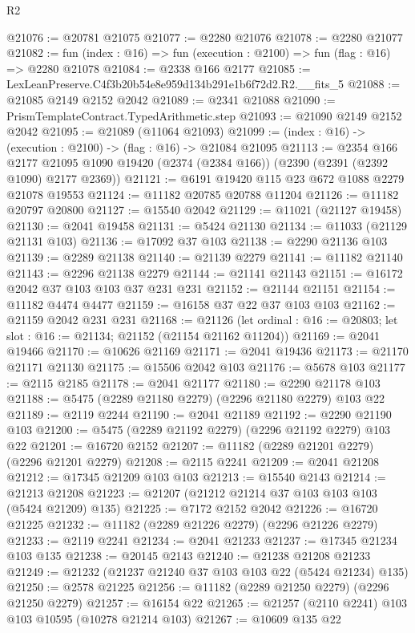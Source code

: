 \begin{lexlean}{R2}
\begin{coremodule}
@21076 := @20781 @21075
@21077 := @2280 @21076
@21078 := @2280 @21077
@21082 := fun (index : @16) => fun (execution : @2100) => fun (flag : @16) => @2280 @21078
@21084 := @2338 @166 @2177
@21085 := LexLeanPreserve.C4f3b20b54e8e959d134b291e1b6f72d2.R2.__fits_5
@21088 := @21085 @2149 @2152 @2042
@21089 := @2341 @21088
@21090 := PrismTemplateContract.TypedArithmetic.step
@21093 := @21090 @2149 @2152 @2042
@21095 := @21089 (@11064 @21093)
@21099 := (index : @16) -> (execution : @2100) -> (flag : @16) -> @21084 @21095
@21113 := @2354
    @166
    @2177
    @21095
    @1090
    @19420
    (@2374 (@2384 @166))
    (@2390 (@2391 (@2392 @1090) @2177 @2369))
@21121 := @6191 @19420 @115 @23 @672 @1088 @2279 @21078 @19553
@21124 := @11182 @20785 @20788 @11204
@21126 := @11182 @20797 @20800
@21127 := @15540 @2042
@21129 := @11021 (@21127 @19458)
@21130 := @2041 @19458
@21131 := @5424 @21130
@21134 := @11033 (@21129 @21131 @103)
@21136 := @17092 @37 @103
@21138 := @2290 @21136 @103
@21139 := @2289 @21138
@21140 := @21139 @2279
@21141 := @11182 @21140
@21143 := @2296 @21138 @2279
@21144 := @21141 @21143
@21151 := @16172 @2042 @37 @103 @103 @37 @231 @231
@21152 := @21144 @21151
@21154 := @11182 @4474 @4477
@21159 := @16158 @37 @22 @37 @103 @103
@21162 := @21159 @2042 @231 @231
@21168 := @21126
    (let ordinal : @16 := @20803; let slot : @16 := @21134; @21152 (@21154 @21162 @11204))
@21169 := @2041 @19466
@21170 := @10626 @21169
@21171 := @2041 @19436
@21173 := @21170 @21171 @21130
@21175 := @15506 @2042 @103
@21176 := @5678 @103
@21177 := @2115 @2185
@21178 := @2041 @21177
@21180 := @2290 @21178 @103
@21188 := @5475 (@2289 @21180 @2279) (@2296 @21180 @2279) @103 @22
@21189 := @2119 @2244
@21190 := @2041 @21189
@21192 := @2290 @21190 @103
@21200 := @5475 (@2289 @21192 @2279) (@2296 @21192 @2279) @103 @22
@21201 := @16720 @2152
@21207 := @11182 (@2289 @21201 @2279) (@2296 @21201 @2279)
@21208 := @2115 @2241
@21209 := @2041 @21208
@21212 := @17345 @21209 @103 @103
@21213 := @15540 @2143
@21214 := @21213 @21208
@21223 := @21207 (@21212 @21214 @37 @103 @103 @103 (@5424 @21209) @135)
@21225 := @7172 @2152 @2042
@21226 := @16720 @21225
@21232 := @11182 (@2289 @21226 @2279) (@2296 @21226 @2279)
@21233 := @2119 @2241
@21234 := @2041 @21233
@21237 := @17345 @21234 @103 @135
@21238 := @20145 @2143
@21240 := @21238 @21208 @21233
@21249 := @21232 (@21237 @21240 @37 @103 @103 @22 (@5424 @21234) @135)
@21250 := @2578 @21225
@21256 := @11182 (@2289 @21250 @2279) (@2296 @21250 @2279)
@21257 := @16154 @22
@21265 := @21257 (@2110 @2241) @103 @103 @10595 (@10278 @21214 @103)
@21267 := @10609 @135 @22

\end{coremodule}
\end{lexlean}
